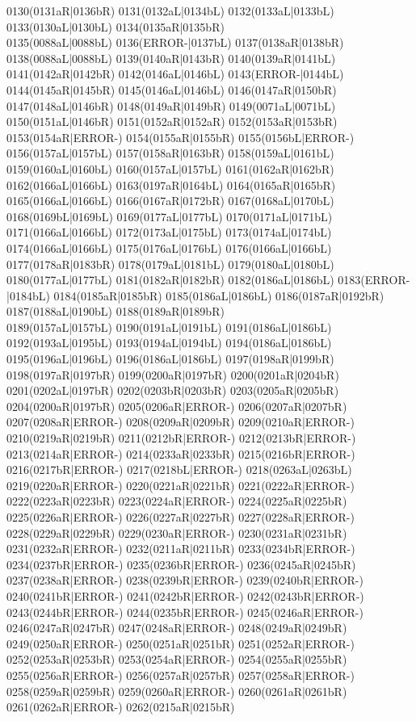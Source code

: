 0130(0131aR|0136bR) 0131(0132aL|0134bL) 0132(0133aL|0133bL) 0133(0130aL|0130bL) 0134(0135aR|0135bR) \\0135(0088aL|0088bL) 0136(ERROR-|0137bL) 0137(0138aR|0138bR) 0138(0088aL|0088bL) 0139(0140aR|0143bR) 0140(0139aR|0141bL) 0141(0142aR|0142bR) 0142(0146aL|0146bL) 0143(ERROR-|0144bL) \\0144(0145aR|0145bR) 0145(0146aL|0146bL) 0146(0147aR|0150bR) 0147(0148aL|0146bR) 0148(0149aR|0149bR) 0149(0071aL|0071bL) 0150(0151aL|0146bR) 0151(0152aR|0152aR) 0152(0153aR|0153bR) \\0153(0154aR|ERROR-) 0154(0155aR|0155bR) 0155(0156bL|ERROR-) 0156(0157aL|0157bL) 0157(0158aR|0163bR) 0158(0159aL|0161bL) 0159(0160aL|0160bL) 0160(0157aL|0157bL) 0161(0162aR|0162bR) \\0162(0166aL|0166bL) 0163(0197aR|0164bL) 0164(0165aR|0165bR) 0165(0166aL|0166bL) 0166(0167aR|0172bR) 0167(0168aL|0170bL) 0168(0169bL|0169bL) 0169(0177aL|0177bL) 0170(0171aL|0171bL) \\0171(0166aL|0166bL) 0172(0173aL|0175bL) 0173(0174aL|0174bL) 0174(0166aL|0166bL) 0175(0176aL|0176bL) 0176(0166aL|0166bL) 0177(0178aR|0183bR) 0178(0179aL|0181bL) 0179(0180aL|0180bL) \\0180(0177aL|0177bL) 0181(0182aR|0182bR) 0182(0186aL|0186bL) 0183(ERROR-|0184bL) 0184(0185aR|0185bR) 0185(0186aL|0186bL) 0186(0187aR|0192bR) 0187(0188aL|0190bL) 0188(0189aR|0189bR) \\0189(0157aL|0157bL) 0190(0191aL|0191bL) 0191(0186aL|0186bL) 0192(0193aL|0195bL) 0193(0194aL|0194bL) 0194(0186aL|0186bL) 0195(0196aL|0196bL) 0196(0186aL|0186bL) 0197(0198aR|0199bR) \\0198(0197aR|0197bR) 0199(0200aR|0197bR) 0200(0201aR|0204bR) 0201(0202aL|0197bR) 0202(0203bR|0203bR) 0203(0205aR|0205bR) 0204(0200aR|0197bR) 0205(0206aR|ERROR-) 0206(0207aR|0207bR) \\0207(0208aR|ERROR-) 0208(0209aR|0209bR) 0209(0210aR|ERROR-) 0210(0219aR|0219bR) 0211(0212bR|ERROR-) 0212(0213bR|ERROR-) 0213(0214aR|ERROR-) 0214(0233aR|0233bR) 0215(0216bR|ERROR-) \\0216(0217bR|ERROR-) 0217(0218bL|ERROR-) 0218(0263aL|0263bL) 0219(0220aR|ERROR-) 0220(0221aR|0221bR) 0221(0222aR|ERROR-) 0222(0223aR|0223bR) 0223(0224aR|ERROR-) 0224(0225aR|0225bR) \\0225(0226aR|ERROR-) 0226(0227aR|0227bR) 0227(0228aR|ERROR-) 0228(0229aR|0229bR) 0229(0230aR|ERROR-) 0230(0231aR|0231bR) 0231(0232aR|ERROR-) 0232(0211aR|0211bR) 0233(0234bR|ERROR-) \\0234(0237bR|ERROR-) 0235(0236bR|ERROR-) 0236(0245aR|0245bR) 0237(0238aR|ERROR-) 0238(0239bR|ERROR-) 0239(0240bR|ERROR-) 0240(0241bR|ERROR-) 0241(0242bR|ERROR-) 0242(0243bR|ERROR-) \\0243(0244bR|ERROR-) 0244(0235bR|ERROR-) 0245(0246aR|ERROR-) 0246(0247aR|0247bR) 0247(0248aR|ERROR-) 0248(0249aR|0249bR) 0249(0250aR|ERROR-) 0250(0251aR|0251bR) 0251(0252aR|ERROR-) \\0252(0253aR|0253bR) 0253(0254aR|ERROR-) 0254(0255aR|0255bR) 0255(0256aR|ERROR-) 0256(0257aR|0257bR) 0257(0258aR|ERROR-) 0258(0259aR|0259bR) 0259(0260aR|ERROR-) 0260(0261aR|0261bR) \\0261(0262aR|ERROR-) 0262(0215aR|0215bR) 
